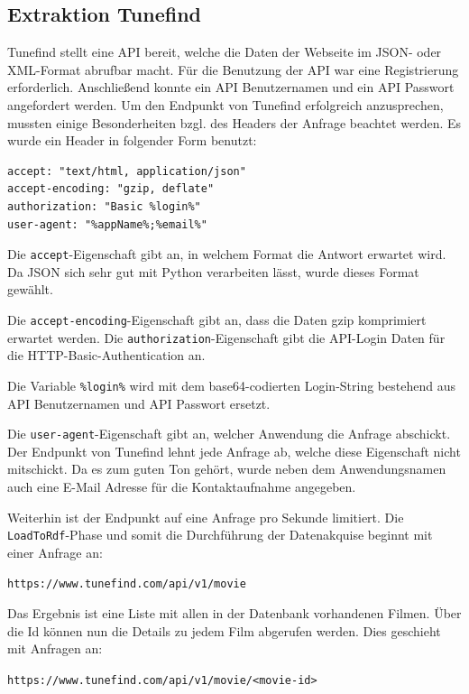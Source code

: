 \documentclass[parskip]{scrartcl}
\begin{document}
\subsection{Extraktion Tunefind}

Tunefind stellt eine API bereit, welche die Daten der Webseite im JSON- oder XML-Format abrufbar macht. Für die Benutzung der API war eine Registrierung erforderlich. Anschließend konnte ein API Benutzernamen und ein API Passwort angefordert werden.
Um den Endpunkt von Tunefind erfolgreich anzusprechen, mussten einige Besonderheiten bzgl. des Headers der Anfrage beachtet werden. Es wurde ein Header in folgender Form benutzt:

\begin{lstlisting}[caption={HTTP Request Header}, label={list:httpHeader}]
accept: "text/html, application/json"
accept-encoding: "gzip, deflate"
authorization: "Basic %login%"
user-agent: "%appName%;%email%"
\end{lstlisting}

Die \texttt{accept}-Eigenschaft gibt an, in welchem Format die Antwort erwartet wird. Da JSON sich sehr gut mit Python verarbeiten lässt, wurde dieses Format gewählt.

Die \texttt{accept-encoding}-Eigenschaft gibt an, dass die Daten gzip komprimiert erwartet werden. Die \texttt{authorization}-Eigenschaft gibt die API-Login Daten für die HTTP-Basic-Authentication an.

Die Variable \texttt{\%login\%} wird mit dem base64-codierten Login-String bestehend aus API Benutzernamen und API Passwort ersetzt.

Die \texttt{user-agent}-Eigenschaft gibt an, welcher Anwendung die Anfrage abschickt. Der Endpunkt von Tunefind lehnt jede Anfrage ab, welche diese Eigenschaft nicht mitschickt. Da es zum guten Ton gehört, wurde neben dem Anwendungsnamen auch eine E-Mail Adresse für die Kontaktaufnahme angegeben. 

Weiterhin ist der Endpunkt auf eine Anfrage pro Sekunde limitiert.
Die \texttt{LoadToRdf}-Phase und somit die Durchführung der Datenakquise beginnt mit einer Anfrage an:

\texttt{https://www.tunefind.com/api/v1/movie}

Das Ergebnis ist eine Liste mit allen in der Datenbank vorhandenen Filmen. Über die Id können nun die Details zu jedem Film abgerufen werden. Dies geschieht mit Anfragen an:

\texttt{https://www.tunefind.com/api/v1/movie/<movie-id>}
\end{document}
